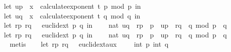 \begin{isabellebody}
\ \ \ \ let\ u{\isacharunderscore}{\kern0pt}p\ {\isacharequal}{\kern0pt}\ x\ {\isacharcircum}{\kern0pt}\ {\isacharparenleft}{\kern0pt}calculate{\isacharunderscore}{\kern0pt}exponent\ t\ p{\isacharparenright}{\kern0pt}\ mod\ p\ in\isanewline
\ \ \ \ let\ u{\isacharunderscore}{\kern0pt}q\ {\isacharequal}{\kern0pt}\ x\ {\isacharcircum}{\kern0pt}\ {\isacharparenleft}{\kern0pt}calculate{\isacharunderscore}{\kern0pt}exponent\ t\ q{\isacharparenright}{\kern0pt}\ mod\ q\ in\isanewline
\ \ \ \ let\ {\isacharparenleft}{\kern0pt}{\isacharparenleft}{\kern0pt}r{\isacharunderscore}{\kern0pt}p{\isacharcomma}{\kern0pt}\ r{\isacharunderscore}{\kern0pt}q{\isacharparenright}{\kern0pt}{\isacharcomma}{\kern0pt}\ {\isacharunderscore}{\kern0pt}{\isacharparenright}{\kern0pt}\ {\isacharequal}{\kern0pt}\ euclid{\isacharunderscore}{\kern0pt}ext\ p\ q\ in\isanewline
\ \ \ \ nat\ {\isacharparenleft}{\kern0pt}{\isacharparenleft}{\kern0pt}u{\isacharunderscore}{\kern0pt}q\ {\isacharasterisk}{\kern0pt}\ r{\isacharunderscore}{\kern0pt}p\ {\isacharasterisk}{\kern0pt}\ p\ {\isacharplus}{\kern0pt}\ u{\isacharunderscore}{\kern0pt}p\ {\isacharasterisk}{\kern0pt}\ r{\isacharunderscore}{\kern0pt}q\ {\isacharasterisk}{\kern0pt}\ q{\isacharparenright}{\kern0pt}\ mod\ {\isacharparenleft}{\kern0pt}p\ {\isacharasterisk}{\kern0pt}\ q{\isacharparenright}{\kern0pt}{\isacharparenright}{\kern0pt}{\isacharparenright}{\kern0pt}\ {\isacharequal}{\kern0pt}\ \isanewline
\ \ \ \ {\isacharparenleft}{\kern0pt}let\ {\isacharparenleft}{\kern0pt}{\isacharparenleft}{\kern0pt}r{\isacharunderscore}{\kern0pt}p{\isacharcomma}{\kern0pt}\ r{\isacharunderscore}{\kern0pt}q{\isacharparenright}{\kern0pt}{\isacharcomma}{\kern0pt}\ {\isacharunderscore}{\kern0pt}{\isacharparenright}{\kern0pt}\ {\isacharequal}{\kern0pt}\ euclid{\isacharunderscore}{\kern0pt}ext\ p\ q\ in\isanewline
\ \ \ \ nat\ {\isacharparenleft}{\kern0pt}{\isacharparenleft}{\kern0pt}{\isacharquery}{\kern0pt}uq\ {\isacharasterisk}{\kern0pt}\ r{\isacharunderscore}{\kern0pt}p\ {\isacharasterisk}{\kern0pt}\ p\ {\isacharplus}{\kern0pt}\ {\isacharquery}{\kern0pt}up\ {\isacharasterisk}{\kern0pt}\ r{\isacharunderscore}{\kern0pt}q\ {\isacharasterisk}{\kern0pt}\ q{\isacharparenright}{\kern0pt}\ mod\ {\isacharparenleft}{\kern0pt}p\ {\isacharasterisk}{\kern0pt}\ q{\isacharparenright}{\kern0pt}{\isacharparenright}{\kern0pt}{\isacharparenright}{\kern0pt}{\isachardoublequoteclose}\ \isanewline
\ \ \ \ \isamarkupfalse%
\ metis\isanewline
\isanewline
\ \ \isamarkupfalse%
\ {\isachardoublequoteopen}{\isacharparenleft}{\kern0pt}let\ {\isacharparenleft}{\kern0pt}{\isacharparenleft}{\kern0pt}r{\isacharunderscore}{\kern0pt}p{\isacharcomma}{\kern0pt}\ r{\isacharunderscore}{\kern0pt}q{\isacharparenright}{\kern0pt}{\isacharcomma}{\kern0pt}\ {\isacharunderscore}{\kern0pt}{\isacharparenright}{\kern0pt}\ {\isacharequal}{\kern0pt}\ euclid{\isacharunderscore}{\kern0pt}ext{\isacharunderscore}{\kern0pt}aux\ {}\ {}\ {}\ {}\ {\isacharparenleft}{\kern0pt}int\ p{\isacharparenright}{\kern0pt}\ {\isacharparenleft}{\kern0pt}int\ q{\isacharparenright}{\kern0pt}\isanewline

\end{isabellebody}
